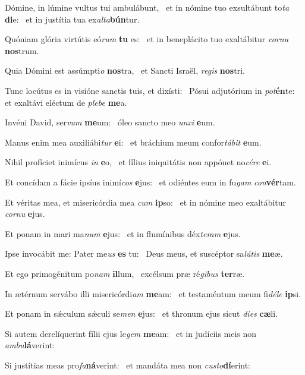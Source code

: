 \item Dómine, in lúmine vultus tui ambulábunt,~\pscross{} et in nómine tuo exsultábunt to\textit{ta} \textbf{di}e:~\psstar{} et in justítia tua ex\textit{alta}\textbf{bún}tur.
\item Quóniam glória virtútis eó\textit{rum} \textbf{tu} es:~\psstar{} et in beneplácito tuo exaltábitur \textit{cornu} \textbf{nos}trum.
\item Quia Dómini est assúmpti\textit{o} \textbf{nos}tra,~\psstar{} et Sancti Israël, \textit{regis} \textbf{nos}tri.
\item Tunc locútus es in visióne sanctis tuis, et dixísti:~\pscross{} Pósui adjutórium in \textit{pot}\textbf{én}te:~\psstar{} et exaltávi eléctum de \textit{plebe} \textbf{me}a.
\item Invéni David, ser\textit{vum} \textbf{me}um:~\psstar{} óleo sancto meo \textit{unxi} \textbf{e}um.
\item Manus enim mea auxiliábi\textit{tur} \textbf{e}i:~\psstar{} et bráchium meum confor\textit{tábit} \textbf{e}um.
\item Nihil profíciet inimícus \textit{in} \textbf{e}o,~\psstar{} et fílius iniquitátis non appónet no\textit{cére} \textbf{e}i.
\item Et concídam a fácie ipsíus inimí\textit{cos} \textbf{e}jus:~\psstar{} et odiéntes eum in fu\textit{gam} \textit{con}\textbf{vér}tam.
\item Et véritas mea, et misericórdia mea \textit{cum} \textbf{ip}so:~\psstar{} et in nómine meo exaltábitur \textit{cornu} \textbf{e}jus.
\item Et ponam in mari ma\textit{num} \textbf{e}jus:~\psstar{} et in flumínibus déx\textit{teram} \textbf{e}jus.
\item Ipse invocábit me: Pater me\textit{us} \textbf{es} tu:~\psstar{} Deus meus, et suscéptor sa\textit{lútis} \textbf{me}æ.
\item Et ego primogénitum po\textit{nam} \textbf{il}lum,~\psstar{} excélsum præ ré\textit{gibus} \textbf{ter}ræ.
\item In ætérnum servábo illi misericórdi\textit{am} \textbf{me}am:~\psstar{} et testaméntum meum fi\textit{déle} \textbf{ip}si.
\item Et ponam in sǽculum sǽculi se\textit{men} \textbf{e}jus:~\psstar{} et thronum ejus sicut \textit{dies} \textbf{cæ}li.
\item Si autem derelíquerint fílii ejus le\textit{gem} \textbf{me}am:~\psstar{} et in judíciis meis non \textit{ambu}\textbf{lá}verint:
\item Si justítias meas pro\textit{fa}\textbf{ná}ve\-rint:~\psstar{} et mandáta mea non \textit{custo}\textbf{dí}erint:
